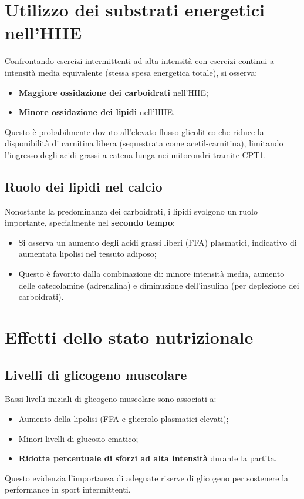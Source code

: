 \documentclass[12pt,a4paper]{report}
\begin{document}
\section{Utilizzo dei substrati energetici nell'HIIE}
Confrontando esercizi intermittenti ad alta intensità con esercizi continui a intensità media equivalente (stessa spesa energetica totale), si osserva:
\begin{itemize}
\item \textbf{Maggiore ossidazione dei carboidrati} nell'HIIE;
\item \textbf{Minore ossidazione dei lipidi} nell'HIIE.
\end{itemize}
Questo è probabilmente dovuto all'elevato flusso glicolitico che riduce la disponibilità di carnitina libera (sequestrata come acetil-carnitina), limitando l'ingresso degli acidi grassi a catena lunga nei mitocondri tramite CPT1.
\subsection{Ruolo dei lipidi nel calcio}
Nonostante la predominanza dei carboidrati, i lipidi svolgono un ruolo importante, specialmente nel \textbf{secondo tempo}:
\begin{itemize}
\item Si osserva un aumento degli acidi grassi liberi (FFA) plasmatici, indicativo di aumentata lipolisi nel tessuto adiposo;
\item Questo è favorito dalla combinazione di: minore intensità media, aumento delle catecolamine (adrenalina) e diminuzione dell'insulina (per deplezione dei carboidrati).
\end{itemize}

\section{Effetti dello stato nutrizionale}
\subsection{Livelli di glicogeno muscolare}
Bassi livelli iniziali di glicogeno muscolare sono associati a:
\begin{itemize}
\item Aumento della lipolisi (FFA e glicerolo plasmatici elevati);
\item Minori livelli di glucosio ematico;
\item \textbf{Ridotta percentuale di sforzi ad alta intensità} durante la partita.
\end{itemize}
Questo evidenzia l'importanza di adeguate riserve di glicogeno per sostenere la performance in sport intermittenti.
\end{document}
